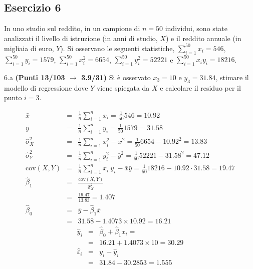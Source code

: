 \documentclass[
  11pt,
]{book}
\theoremstyle{mytheoremstyle}
\theoremstyle{mydefstyle}
\newenvironment{sol}
  {
  \begin{tcolorbox}[enhanced,breakable,arc=0.1mm,boxrule=1pt,colback=white,colframe=iblue,
  title=\bf \fontfamily{lmss}\selectfont \hspace{.5 cm} Soluzione,drop fuzzy shadow]

}{
\end{tcolorbox}
  }
\begin{document}
\subsection{Esercizio 6}\label{esercizio-6-29}

In uno studio sul reddito, in un campione di \(n=50\) individui, sono state analizzati il livello di istruzione (in anni di studio, \(X\)) e il reddito annuale (in migliaia di euro, \(Y\)).
Si osservano le seguenti statistiche, \(\sum_{i=1}^{50}x_i=546\), \(\sum_{i=1}^{50}y_i=1579\),
\(\sum_{i=1}^{50}x_i^2=6654\), \(\sum_{i=1}^{50}y_i^2=52221\) e \(\sum_{i=1}^{50}x_iy_i=18216\).

6.a \textbf{(Punti 13/103 \(\rightarrow\) 3.9/31)} Si è osservato \(x_3=10\) e \(y_3=31.84\), stimare il modello di regressione dove \(Y\) viene spiegata da \(X\) e calcolare il residuo per il punto \(i=3\).

\begin{sol}
\begin{eqnarray*}
           \bar x &=&\frac 1 n\sum_{i=1}^n x_i = \frac {1}{ 50 }  546 =  10.92 \\
           \bar y &=&\frac 1 n\sum_{i=1}^n y_i = \frac {1}{ 50 }  1579 =  31.58 \\
           \hat\sigma_X^2&=&\frac 1 n\sum_{i=1}^n x_i^2-\bar x^2=\frac {1}{ 50 }  6654  - 10.92 ^2= 13.83 \\
           \hat\sigma_Y^2&=&\frac 1 n\sum_{i=1}^n y_i^2-\bar y^2=\frac {1}{ 50 }  52221  - 31.58 ^2= 47.12 \\
           \text{cov}(X,Y)&=&\frac 1 n\sum_{i=1}^n x_i~y_i-\bar x\bar y=\frac {1}{ 50 }  18216 - 10.92 \cdot 31.58 = 19.47 \\
           \hat\beta_1 &=& \frac{\text{cov}(X,Y)}{\hat\sigma_X^2} \\
                    &=& \frac{ 19.47 }{ 13.83 }  =  1.407 \\
           \hat\beta_0 &=& \bar y - \hat\beta_1 \bar x\\
                    &=&  31.58 - 1.4073 \times  10.92 = 16.21 
         \end{eqnarray*}\begin{eqnarray*}
\hat y_i &=&\hat\beta_0+\hat\beta_1 x_i=\\ 
&=& 16.21 + 1.4073 \times 10 = 30.29 \\ 
\hat \varepsilon_i &=& y_i-\hat y_i\\ 
&=& 31.84 - 30.2853 = 1.555  
\end{eqnarray*}

\end{sol}
\end{document}
